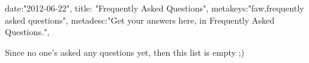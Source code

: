 {
date:"2012-06-22",
title: "Frequently Asked Questions",
metakeys:"faw,frequently asked questions",
metadesc:"Get your answers here, in Frequently Asked Questions.",
}

Since no one's asked any questions yet, then this list is empty ;)

